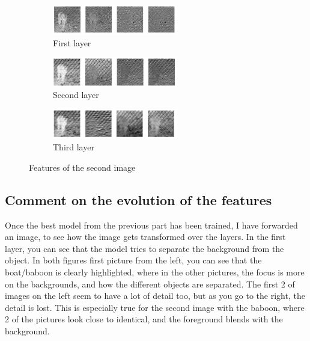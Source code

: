 \documentclass{article}
\begin{document}
    \begin{figure}[h!]
        \centering
        \begin{subfigure}[t]{0.6\textwidth}
            \centering
            \includegraphics[width=0.6\textwidth]{image2_layer1}
            \caption{First layer}
        \end{subfigure}
        \begin{subfigure}[t]{0.6\textwidth}
            \centering
            \includegraphics[width=0.6\textwidth]{image2_layer2}
            \caption{Second layer}
        \end{subfigure}
        \begin{subfigure}[t]{0.6\textwidth}
            \centering
            \includegraphics[width=0.6\textwidth]{image2_layer3}
            \caption{Third layer}
        \end{subfigure}
        \caption{Features of the second image}
    \end{figure}

    \subsection{Comment on the evolution of the features}
    Once the best model from the previous part has been trained, I have forwarded an image, to see how the image gets transformed over the layers. In the first layer, you can see that the model tries to separate the background from the object. In both figures first picture from the left, you can see that the boat/baboon is clearly highlighted, where in the other pictures, the focus is more on the backgrounds, and how the different objects are separated. The first 2 of images on the left seem to have a lot of detail too, but as you go to the right, the detail is lost. This is especially true for the second image with the baboon, where 2 of the pictures look close to identical, and the foreground blends with the background.\\
\end{document}
